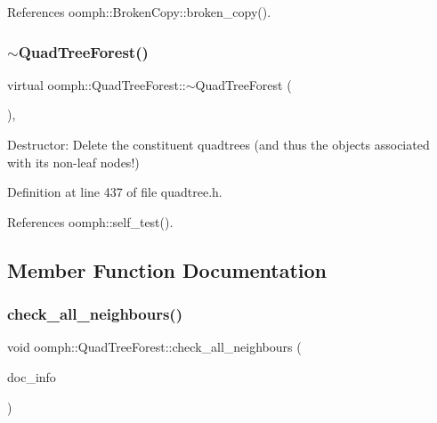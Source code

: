 References oomph\+::\+Broken\+Copy\+::broken\+\_\+copy().

\mbox{\label{classoomph_1_1QuadTreeForest_ae780732924695535c5a501ea17ceb741}} 
\subsubsection{\texorpdfstring{$\sim$\+Quad\+Tree\+Forest()}{~QuadTreeForest()}}
{\footnotesize\ttfamily virtual oomph\+::\+Quad\+Tree\+Forest\+::$\sim$\+Quad\+Tree\+Forest (\begin{DoxyParamCaption}{ }\end{DoxyParamCaption})\hspace{0.3cm}{\ttfamily [inline]}, {\ttfamily [virtual]}}



Destructor\+: Delete the constituent quadtrees (and thus the objects associated with its non-\/leaf nodes!) 



Definition at line 437 of file quadtree.\+h.



References oomph\+::self\+\_\+test().



\subsection{Member Function Documentation}
\mbox{\label{classoomph_1_1QuadTreeForest_a7ae708ced04343303be644f87cb1c169}} 
\subsubsection{\texorpdfstring{check\+\_\+all\+\_\+neighbours()}{check\_all\_neighbours()}}
{\footnotesize\ttfamily void oomph\+::\+Quad\+Tree\+Forest\+::check\+\_\+all\+\_\+neighbours (\begin{DoxyParamCaption}\item[{\hyperlink{classoomph_1_1DocInfo}{Doc\+Info} \&}]{doc\+\_\+info }\end{DoxyParamCaption})\hspace{0.3cm}{\ttfamily [virtual]}}



